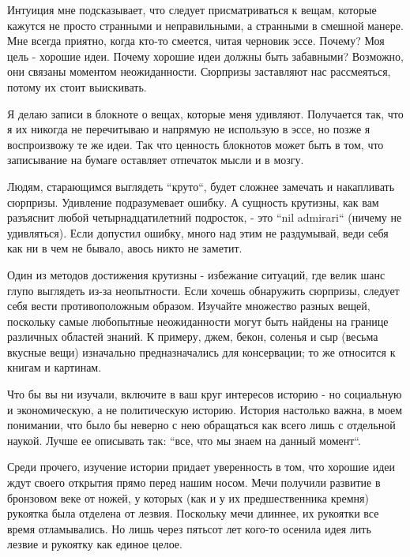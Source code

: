 \documentclass[ebook,12pt,oneside,openany]{memoir}
\begin{document}
Интуиция мне подсказывает, что следует присматриваться к вещам,
которые кажутся не просто странными и неправильными, а странными в
смешной манере. Мне всегда приятно, когда кто-то смеется, читая
черновик эссе. Почему? Моя цель - хорошие идеи. Почему хорошие идеи
должны быть забавными? Возможно, они связаны моментом неожиданности.
Сюрпризы заставляют нас рассмеяться, потому их стоит выискивать.
\newline

Я делаю записи в блокноте о вещах, которые меня удивляют. Получается
так, что я их никогда не перечитываю и напрямую не использую в эссе,
но позже я воспроизвожу те же идеи. Так что ценность блокнотов может
быть в том, что записывание на бумаге оставляет отпечаток мысли и в
мозгу. \newline

Людям, старающимся выглядеть ``круто``, будет сложнее замечать и
накапливать сюрпризы. Удивление подразумевает ошибку. А сущность
крутизны, как вам разъяснит любой четырнадцатилетний подросток, - это
``nil admirari`` (ничему не удивляться). Если допустил ошибку, много
над этим не раздумывай, веди себя как ни в чем не бывало, авось никто
не заметит. \newline

Один из методов достижения крутизны - избежание ситуаций, где велик
шанс глупо выглядеть из-за неопытности. Если хочешь обнаружить
сюрпризы, следует себя вести противоположным образом. Изучайте
множество разных вещей, поскольку самые любопытные неожиданности могут
быть найдены на границе различных областей знаний. К примеру, джем,
бекон, соленья и сыр (весьма вкусные вещи) изначально предназначались
для консервации; то же относится к книгам и картинам. \newline

Что бы вы ни изучали, включите в ваш круг интересов историю - но
социальную и экономическую, а не политическую историю. История
настолько важна, в моем понимании, что было бы неверно с нею
обращаться как всего лишь с отдельной наукой. Лучше ее описывать так:
``все, что мы знаем на данный момент``. \newline

Среди прочего, изучение истории придает уверенность в том, что хорошие
идеи ждут своего открытия прямо перед нашим носом. Мечи получили
развитие в бронзовом веке от ножей, у которых (как и у их
предшественника кремня) рукоятка была отделена от лезвия. Поскольку
мечи длиннее, их рукоятки все время отламывались. Но лишь через
пятьсот лет кого-то осенила идея лить лезвие и рукоятку как единое
целое. \newline
\end{document}
